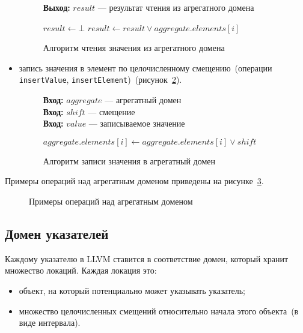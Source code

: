 \begin{itemize}
\begin{figure}[h!]
\textbf{Выход:} $result$ --- результат чтения из агрегатного домена

\begin{algorithmic}[1]
\State $result \gets \bot$
    \State $result \gets result \vee aggregate.elements[i]$
\EndFor
\end{algorithmic}
\caption{Алгоритм чтения значения из агрегатного домена}
\label{image:arrayLoad}
\end{figure}

\item запись значения в элемент по целочисленному смещению~(операции
\texttt{insertValue}, \texttt{insertElement})~(рисунок~\ref{image:arrayStore}).
\begin{figure}[h!]
\textbf{Вход:} $aggregate$ --- агрегатный домен\\
\textbf{Вход:} $shift$ --- смещение\\
\textbf{Вход:} $value$ --- записываемое значение

\begin{algorithmic}[1]
    \State $aggregate.elements[i] \gets aggregate.elements[i] \vee shift$
\EndFor
\end{algorithmic}
\caption{Алгоритм записи значения в агрегатный домен}
\label{image:arrayStore}
\end{figure}
\end{itemize}

Примеры операций над агрегатным доменом приведены на 
рисунке~\ref{image:aggregateDomain}.
\begin{figure}[h!]
\caption{Примеры операций над агрегатным доменом}
\label{image:aggregateDomain}
\end{figure}

\subsection{Домен указателей}
Каждому указателю в LLVM ставится в соответствие домен, который хранит 
множество локаций. Каждая локация это:
\begin{itemize}
\item объект, на который потенциально может указывать указатель;
\item множество целочисленных смещений относительно начала этого объекта~(в 
виде интервала).
\end{itemize}

